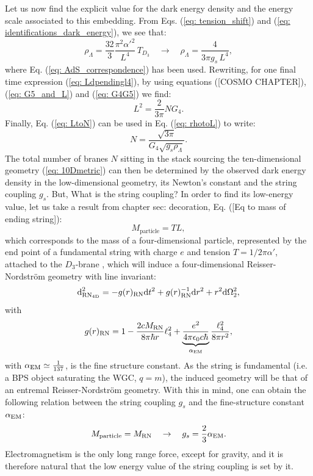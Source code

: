 Let us now find the explicit value for the dark energy density and the energy scale associated to this embedding. From Eqs. (\ref{eq: tension_shift}) and (\ref{eq: identifications_dark_energy}), we see that:
\begin{equation}\label{eq: rhotoL}
    \rho_{\Lambda} = \frac{32}{3} \frac{\pi^{2} \alpha'^{2}}{L^{4}} \, T_{D_3}  \quad \rightarrow \quad \rho_{\Lambda} = \frac{4}{3\pi g_{s}\, L^{4}}  ,
\end{equation}
where Eq. (\ref{eq: AdS_correspondence}) has been used. Rewriting, for one final time expression (\ref{eq: Ldpendingl4}), by using equations ([COSMO CHAPTER]), (\ref{eq: G5_and_L}) and (\ref{eq: G4G5}) we find:
\begin{equation}\label{eq: LtoN}
    L^2=\frac{2}{3\pi} N G_4.
\end{equation}
Finally, Eq. (\ref{eq: LtoN}) can be used in Eq. (\ref{eq: rhotoL}) to write:
\begin{equation}\label{eq: number_N}
    N = \frac{\sqrt{3 \pi}}{ G_4 \sqrt{g_{s} \rho_\Lambda}}.
\end{equation}
The total number of branes $N$ sitting in the stack sourcing the ten-dimensional geometry (\ref{eq: 10Dmetric}) can then be determined by the observed dark energy density in the low-dimensional geometry, its Newton's constant and the string coupling $g_{s}$. But, What is the string coupling? In order to find its low-energy value, let us take a result from chapter {sec: decoration}, Eq. ([Eq to mass of ending string]):
\begin{equation}
    M_{\text{particle}} = T L,
\end{equation}
which corresponds to the mass of a four-dimensional particle, represented by the end point of a fundamental string with charge $e$ and tension $T = 1/2\pi \alpha'$, attached to the $D_{3}$-brane \cite{Banerjee:2019aa}, which will induce a four-dimensional Reisser-Nordström geometry with line invariant:
\begin{equation}
    \text{d}_{\rm RN_{4D}}^{2} = - g(r)_{\rm RN} \text{d} t^{2} + g(r)_{\rm RN}^{-1} \text{d} r^{2} + r^{2} \text{d} \Omega_{2}^{2}, 
\end{equation}
with
\begin{equation}
    g(r)_{\rm RN} = 1 - \frac{2 c M_{\rm RN} }{8 \pi \hbar r } \ell_{4}^{2}  + \underbrace{\frac{e^{2}}{4\pi\epsilon_{0} c \hbar}}_{\alpha_{\rm EM}} \frac{\ell_{4}^{2}}{8 \pi r^{2}},
\end{equation}
with $\alpha_{\rm EM} \simeq \tfrac{1}{137}$, is the fine structure constant. As the string is fundamental (i.e. a BPS object saturating the WGC, $q = m$), the induced geometry will be that of an entremal Reisser-Nordström geometry. With this in mind, one can obtain the following relation between the string coupling $g_{s}$ and the fine-structure constant $\alpha_{\rm EM}$:
\begin{equation}\label{eq: gs_to_alpha}
    M_{\text{particle}} = M_{{\rm RN}} \quad \rightarrow \quad  g_{s} = \frac{2}{3} \alpha_{\rm EM}.
\end{equation}
Electromagnetism is the only long range force, except for gravity, and it is therefore natural that the low energy value of the string coupling is set by it.


